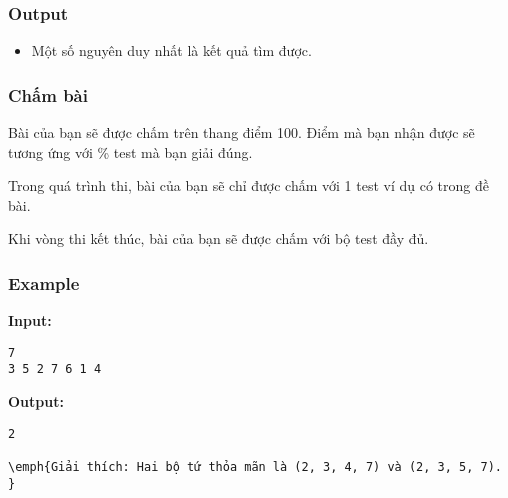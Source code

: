 \subsubsection{Output}
\begin{itemize}
	\item Một số nguyên duy nhất là kết quả tìm được.
\end{itemize}

\subsubsection{Chấm bài}

Bài của bạn sẽ được chấm trên thang điểm 100. Điểm mà bạn nhận được sẽ tương ứng với \% test mà bạn giải đúng.

Trong quá trình thi, bài của bạn sẽ chỉ được chấm với 1 test ví dụ có trong đề bài.

Khi vòng thi kết thúc, bài của bạn sẽ được chấm với bộ test đầy đủ.

\subsubsection{Example}

\textbf{Input: }
\begin{verbatim}
7
3 5 2 7 6 1 4\end{verbatim}

\textbf{Output: }
\begin{verbatim}
2

\emph{Giải thích: Hai bộ tứ thỏa mãn là (2, 3, 4, 7) và (2, 3, 5, 7). }\end{verbatim}
